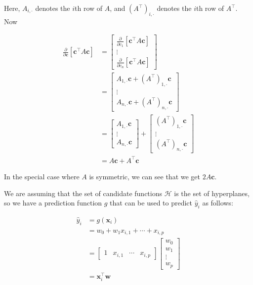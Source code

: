 \documentclass[12pt]{article}
\begin{document}
\begin{enumerate}
Here, $A_{i,\cdot}$ denotes the $i$th row of $A$, and $(A^\top)_{i,\cdot}$ denotes the
$i$th row of $A^\top$. Now

\begin{align*}
	\frac{\partial}{\partial\mathbf{c}}[\mathbf{c}^\top A\mathbf{c}]
	&=\begin{bmatrix}
		\frac{\partial}{\partial c_1}[\mathbf{c}^\top A\mathbf{c}]\\
		\vdots\\
		\frac{\partial}{\partial c_n}[\mathbf{c}^\top A\mathbf{c}]
	\end{bmatrix}\\
	&=\begin{bmatrix}
		A_{1,\cdot}\mathbf{c}+(A^\top)_{1,\cdot}\mathbf{c}\\
		\vdots\\
		A_{n,\cdot}\mathbf{c}+(A^\top)_{n,\cdot}\mathbf{c}
	\end{bmatrix}\\
	&=\begin{bmatrix}
		A_{1,\cdot}\mathbf{c}\\
		\vdots\\
		A_{n,\cdot}\mathbf{c}
	\end{bmatrix}
	+\begin{bmatrix}
		(A^\top)_{1,\cdot}\mathbf{c}\\
		\vdots\\
		(A^\top)_{n,\cdot}\mathbf{c}
	\end{bmatrix}\\
	&=A\mathbf{c} + A^\top \mathbf{c}
\end{align*}

In the special case where $A$ is symmetric, we can see that we get $2A\mathbf{c}$.


We are assuming that the set of candidate functions $\mathcal{H}$ is the set of hyperplanes,
so we have a prediction function $g$ that can be used to predict $\hat{y}_i$ as follows:

\begin{align*}
	\hat{y}_i
	&=g(\mathbf{x}_i)\\
	&=w_0+w_1x_{i, 1}+\cdots+x_{i, p}\\
	&=\begin{bmatrix}
		1 & x_{i, 1} & \cdots & x_{i, p}
	\end{bmatrix}
	\begin{bmatrix}
		w_0\\
		w_1\\
		\vdots\\
		w_p
	\end{bmatrix}\\
	&=\mathbf{x}_i^\top \mathbf{w}
\end{align*}


\end{enumerate}
\end{document}
